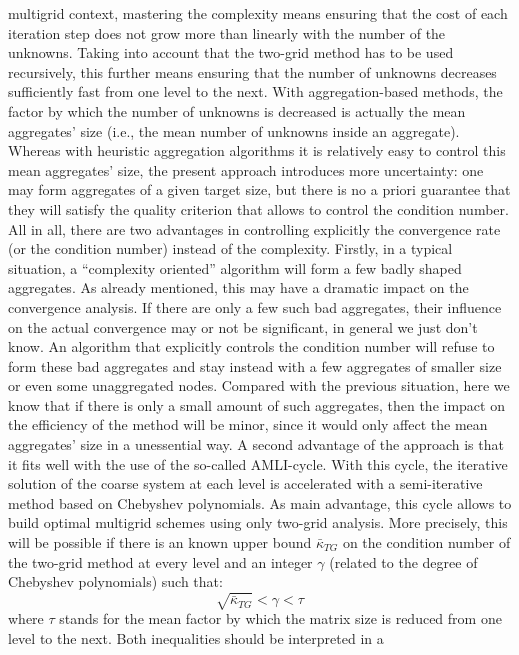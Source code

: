 multigrid context, mastering the complexity means ensuring that the cost of
each iteration step does not grow more than linearly with the number of the
unknowns. Taking into account that the two-grid method has to be used
recursively, this further means ensuring that the number of unknowns decreases
sufficiently fast from one level to the next. With aggregation-based methods,
the factor by which the number of unknowns is decreased is actually the mean
aggregates' size (i.e., the mean number of unknowns inside an aggregate).
Whereas with heuristic aggregation algorithms it is relatively easy to control
this mean aggregates' size, the present approach introduces more uncertainty:
one may form aggregates of a given target size, but there is no a priori
guarantee that they will satisfy the quality criterion that allows to control
the condition number. All in all, there are two advantages in controlling
explicitly the convergence rate (or the condition number) instead of the
complexity. Firstly, in a typical situation, a ``complexity oriented''
algorithm will form a few badly shaped aggregates. As already mentioned, this
may have a dramatic impact on the convergence analysis. If there are only a
few such bad aggregates, their influence on the actual convergence may or not
be significant, in general we just don't know. An algorithm that explicitly
controls the condition number will refuse to form these bad aggregates and
stay instead with a few aggregates of smaller size or even some unaggregated
nodes. Compared with the previous situation, here we know that if there is
only a small amount of such aggregates, then the impact on the efficiency of
the method will be minor, since it would only affect the mean aggregates' size
in a unessential way. A second advantage of the approach is that it fits well
with the use of the so-called AMLI-cycle. With this cycle, the iterative
solution of the coarse system at each level is accelerated with a
semi-iterative method based on Chebyshev polynomials. As main advantage, this
cycle allows to build optimal multigrid schemes using only two-grid analysis.
More precisely, this will be possible if there is an known upper bound
$\bar{\kappa}_{TG}$ on the condition number of the two-grid method at every
level and an integer $\gamma$ (related to the degree of Chebyshev polynomials)
such that:
\begin{equation}
\sqrt{\bar{\kappa}_{TG}} < \gamma < \tau
\end{equation}
where $\tau$ stands for the mean factor by which the matrix size is reduced
from one level to the next. Both inequalities should be interpreted in a
